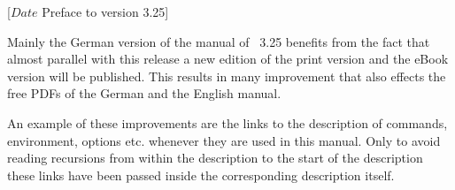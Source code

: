 %
%
%
%
%
%
%
%
%

                 [$Date$
                  Preface to version 3.25]



Mainly the German version of the manual of \KOMAScript~3.25 benefits from the
fact that almost parallel with this release a new edition of the print version
\cite{book:komascript} and the eBook version \cite{ebook:komascript} will be
published. This results in many improvement that also effects the free PDFs of
the German and the English manual.

An example of these improvements are the links to the description of commands,
environment, options etc. whenever they are used in this manual. Only to avoid
reading recursions from within the description to the start of the description
these links have been passed inside the corresponding description itself.

